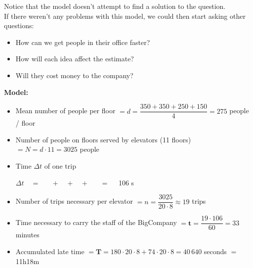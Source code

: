 \begin{annotation}
\begin{goals}
	Notice that the model doesn't attempt to find a solution to the question. \\
	
	If there weren't any problems with this model, we could then start asking other questions:
	\begin{itemize}
		\item How can we get people in their office faster? 
		\item How will each idea affect the estimate?
		\item Will they cost money to the company?
	\end{itemize}
\end{goals}
\end{annotation}
\textbf{Model:}
\begin{itemize}
	\item Mean number of people per floor $= d = \dfrac{350+350+250+150}{4} = 275$ people / floor
	\item Number of people on floors served by elevators (11 floors) $= N = d \cdot 11 = 3025$ people
	\item Time $\Delta t$ of one trip

\hfil $\Delta t \quad = \quad $  
		$ \;+ \;$ 
		$ \;+\; $ 
		$\;+\; $  $\quad = \quad$ 106 s
		
		\item Number of trips necessary per elevator $= n = \dfrac{3025}{20 \cdot 8} \approx 19$ trips

		\item Time necessary to carry the staff of the BigCompany $= \pmb{t} = \dfrac{19 \cdot 106}{60} = 33 $ minutes
		
		\item Accumulated late time $ = \pmb{T} = 180 \cdot 20 \cdot 8 + 74 \cdot 20 \cdot 8 = 40\,640$ seconds $= $ 11h18m

\end{itemize}

